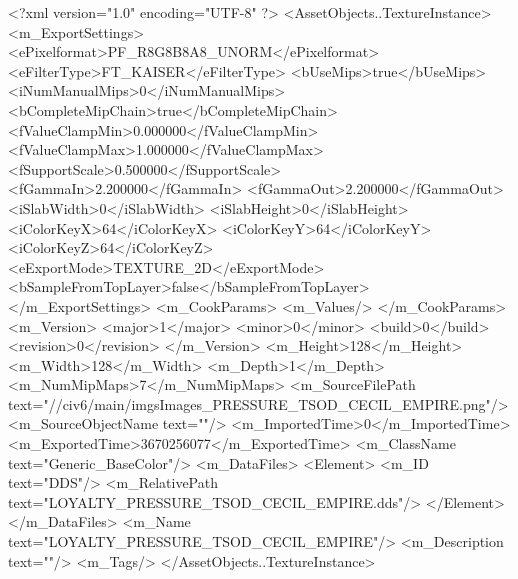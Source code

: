 <?xml version="1.0" encoding="UTF-8" ?>
<AssetObjects..TextureInstance>
	<m_ExportSettings>
		<ePixelformat>PF_R8G8B8A8_UNORM</ePixelformat>
		<eFilterType>FT_KAISER</eFilterType>
		<bUseMips>true</bUseMips>
		<iNumManualMips>0</iNumManualMips>
		<bCompleteMipChain>true</bCompleteMipChain>
		<fValueClampMin>0.000000</fValueClampMin>
		<fValueClampMax>1.000000</fValueClampMax>
		<fSupportScale>0.500000</fSupportScale>
		<fGammaIn>2.200000</fGammaIn>
		<fGammaOut>2.200000</fGammaOut>
		<iSlabWidth>0</iSlabWidth>
		<iSlabHeight>0</iSlabHeight>
		<iColorKeyX>64</iColorKeyX>
		<iColorKeyY>64</iColorKeyY>
		<iColorKeyZ>64</iColorKeyZ>
		<eExportMode>TEXTURE_2D</eExportMode>
		<bSampleFromTopLayer>false</bSampleFromTopLayer>
	</m_ExportSettings>
	<m_CookParams>
		<m_Values/>
	</m_CookParams>
	<m_Version>
		<major>1</major>
		<minor>0</minor>
		<build>0</build>
		<revision>0</revision>
	</m_Version>
	<m_Height>128</m_Height>
	<m_Width>128</m_Width>
	<m_Depth>1</m_Depth>
	<m_NumMipMaps>7</m_NumMipMaps>
	<m_SourceFilePath text="//civ6/main/imgs\Processed Images\LOYALTY_PRESSURE_TSOD_CECIL_EMPIRE.png"/>
	<m_SourceObjectName text=""/>
	<m_ImportedTime>0</m_ImportedTime>
	<m_ExportedTime>3670256077</m_ExportedTime>
	<m_ClassName text="Generic_BaseColor"/>
	<m_DataFiles>
		<Element>
			<m_ID text="DDS"/>
			<m_RelativePath text="LOYALTY_PRESSURE_TSOD_CECIL_EMPIRE.dds"/>
		</Element>
	</m_DataFiles>
	<m_Name text="LOYALTY_PRESSURE_TSOD_CECIL_EMPIRE"/>
	<m_Description text=""/>
	<m_Tags/>
</AssetObjects..TextureInstance>

